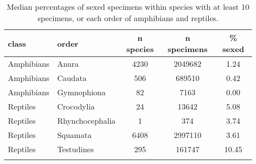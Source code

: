 \begin{longtable}{llccc}
\caption{Median percentages of sexed specimens within species with at least 
                   10 specimens, or each order of amphibians and reptiles.} \\ 
  \hline
class & order & n species & n specimens & \% sexed \\ 
  \hline
Amphibians & Anura & 4230 & 2049682 & 1.24 \\ 
  Amphibians & Caudata & 506 & 689510 & 0.42 \\ 
  Amphibians & Gymnophiona &  82 & 7163 & 0.00 \\ 
  Reptiles & Crocodylia &  24 & 13642 & 5.08 \\ 
  Reptiles & Rhynchocephalia &   1 & 374 & 3.74 \\ 
  Reptiles & Squamata & 6408 & 2997110 & 3.61 \\ 
  Reptiles & Testudines & 295 & 161747 & 10.45 \\ 
   \hline
\hline
\label{table-orders}
\end{longtable}
